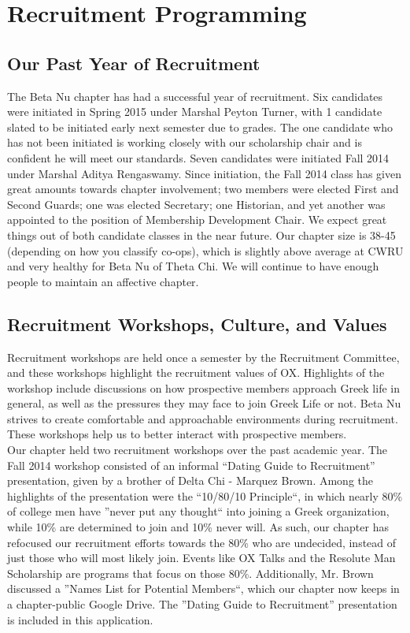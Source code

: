 \chapter{Recruitment Programming}
  
  \section*{Our Past Year of Recruitment}
    The Beta Nu chapter has had a successful year of recruitment. Six candidates were initiated in Spring 2015 under Marshal Peyton Turner, with 1 candidate slated to be initiated early next semester due to grades. The one candidate who has not been initiated is working closely with our scholarship chair and is confident he will meet our standards. Seven candidates were initiated Fall 2014 under Marshal Aditya Rengaswamy. Since initiation, the Fall 2014 class has given great amounts towards chapter involvement; two members were elected First and Second Guards; one was elected Secretary; one Historian, and yet another was appointed to the position of Membership Development Chair. We expect great things out of both candidate classes in the near future. Our chapter size is 38-45 (depending on how you classify co-ops), which is slightly above average at CWRU and very healthy for Beta Nu of Theta Chi. We will continue to have enough people to maintain an affective chapter.
    
  \section*{Recruitment Workshops, Culture, and Values}
    Recruitment workshops are held once a semester by the Recruitment Committee, and these workshops highlight the recruitment values of OX. Highlights of the workshop include discussions on how prospective members approach Greek life in general, as well as the pressures they may face to join Greek Life or not. Beta Nu strives to create comfortable and approachable environments during recruitment. These workshops help us to better interact with prospective members. \\

    Our chapter held two recruitment workshops over the past academic year. The Fall 2014 workshop consisted of an informal ``Dating Guide to Recruitment'' presentation, given by a brother of Delta Chi - Marquez Brown. Among the highlights of the presentation were the ``10/80/10 Principle``, in which nearly 80\% of college men have ''never put any thought`` into joining a Greek organization, while 10\% are determined to join and 10\% never will. As such, our chapter has refocused our recruitment efforts towards the 80\% who are undecided, instead of just those who will most likely join. Events like OX Talks and the Resolute Man Scholarship are programs that focus on those 80\%. Additionally, Mr. Brown discussed a ''Names List for Potential Members``, which our chapter now keeps in a chapter-public Google Drive. The ''Dating Guide to Recruitment'' presentation is included in this application. \\

